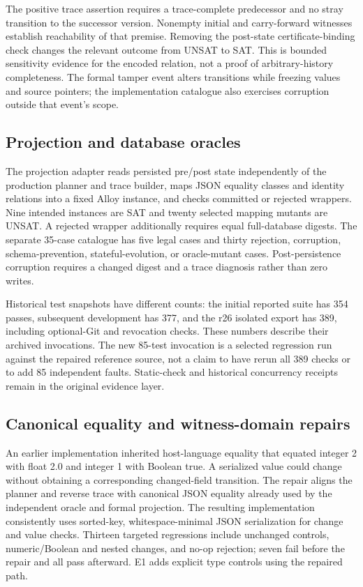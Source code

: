 \documentclass[11pt,a4paper]{article}
\begin{document}
The positive trace assertion requires a trace-complete predecessor and no stray transition to the successor version. Nonempty initial and carry-forward witnesses establish reachability of that premise. Removing the post-state certificate-binding check changes the relevant outcome from UNSAT to SAT. This is bounded sensitivity evidence for the encoded relation, not a proof of arbitrary-history completeness. The formal tamper event alters transitions while freezing values and source pointers; the implementation catalogue also exercises corruption outside that event's scope.

\subsection{Projection and database oracles}

The projection adapter reads persisted pre/post state independently of the production planner and trace builder, maps JSON equality classes and identity relations into a fixed Alloy instance, and checks committed or rejected wrappers. Nine intended instances are SAT and twenty selected mapping mutants are UNSAT. A rejected wrapper additionally requires equal full-database digests. The separate 35-case catalogue has five legal cases and thirty rejection, corruption, schema-prevention, stateful-evolution, or oracle-mutant cases. Post-persistence corruption requires a changed digest and a trace diagnosis rather than zero writes.

Historical test snapshots have different counts: the initial reported suite has 354 passes, subsequent development has 377, and the r26 isolated export has 389, including optional-Git and revocation checks. These numbers describe their archived invocations. The new 85-test invocation is a selected regression run against the repaired reference source, not a claim to have rerun all 389 checks or to add 85 independent faults. Static-check and historical concurrency receipts remain in the original evidence layer.

\subsection{Canonical equality and witness-domain repairs}

An earlier implementation inherited host-language equality that equated integer 2 with float 2.0 and integer 1 with Boolean true. A serialized value could change without obtaining a corresponding changed-field transition. The repair aligns the planner and reverse trace with canonical JSON equality already used by the independent oracle and formal projection. The resulting implementation consistently uses sorted-key, whitespace-minimal JSON serialization for change and value checks. Thirteen targeted regressions include unchanged controls, numeric/Boolean and nested changes, and no-op rejection; seven fail before the repair and all pass afterward. E1 adds explicit type controls using the repaired path.
\end{document}
